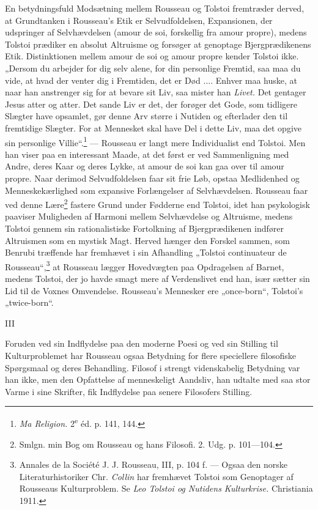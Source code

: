 \documentclass[12pt,a4paper,openany]{book}
\newcommand{\opage}[1]{\marginnote{\footnotesize\textit{[#1]}}}
\begin{document}
En betydningsfuld Modsætning mellem Rousseau og Tolstoi
fremtræder derved, at Grundtanken i Rousseau’s Etik er Selvudfoldelsen,
Expansionen, der udspringer af Selvhævdelsen (amour
de soi, forskellig fra amour propre), medens Tolstoi prædiker en
absolut Altruisme og forsøger at genoptage Bjergprædikenens
Etik. Distinktionen mellem amour de soi og amour propre kender
Tolstoi ikke. „Dersom du arbejder for dig selv alene, for
din personlige Fremtid, saa maa du vide, at hvad der venter
dig i Fremtiden, det er Død .... Enhver maa huske, at naar
han anstrenger sig for at bevare sit Liv, saa mister han \textit{Livet.}
Det gentager Jesus atter og atter. Det sande Liv er det, der
forøger det Gode, som tidligere Slægter have opsamlet, gør denne
Arv større i Nutiden og efterlader den til fremtidige Slægter.
For at Mennesket skal have Del i dette Liv, maa det opgive
\setcounter{footnote}{0}%
\opage{130}sin personlige Villie“.\footnote[1]{\textit{Ma Religion.} 2\textsuperscript{e} éd. p. 141, 144.} --- Rousseau er langt mere Individualist
end Tolstoi. Men han viser paa en interessant Maade, at det
først er ved Sammenligning med Andre, deres Kaar og deres
Lykke, at amour de soi kan gaa over til amour propre. Naar
derimod Selvudfoldelsen faar sit frie Løb, opstaa Medlidenhed
og Menneskekærlighed som expansive Forlængelser af Selvhævdelsen.
Rousseau faar ved denne Lære\footnote[2]{Smlgn. min Bog om Rousseau og hans Filosofi. 2. Udg. p. 101---104.} fastere Grund under
Fødderne end Tolstoi, idet han psykologisk paaviser Muligheden
af Harmoni mellem Selvhævdelse og Altruisme, medens Tolstoi
gennem sin rationalistiske Fortolkning af Bjergprædikenen indfører
Altruismen som en mystisk Magt. Herved hænger den Forskel
sammen, som Benrubi træffende har fremhævet i sin Afhandling
„Tolstoi continuateur de Rousseau“,\footnote[3]{Annales de la Société J. J. Rousseau, III, p. 104 f. --- Ogsaa den norske Literaturhistoriker Chr. \emph{Collin} har fremhævet Tolstoi som Genoptager af Rousseaus Kulturproblem. Se \textit{Leo Tolstoi og Nutidens Kulturkrise.} Christiania 1911.} at Rousseau lægger Hovedvægten
paa Opdragelsen af Barnet, medens Tolstoi, der jo havde
smagt mere af Verdenslivet end han, især sætter sin Lid til de
Voxnes Omvendelse. Rousseau’s Mennesker ere „once-born“,
Tolstoi’s „twice-born“.

\begin{center}III\end{center}


Foruden ved sin Indflydelse paa den moderne Poesi og ved
sin Stilling til Kulturproblemet har Rousseau ogsaa Betydning
for flere speciellere filosofiske Spørgsmaal og deres Behandling.
Filosof i strengt videnskabelig Betydning var han ikke, men
den Opfattelse af menneskeligt Aandsliv, han udtalte med saa
stor Varme i sine Skrifter, fik Indflydelse paa senere Filosofers
Stilling.
\end{document}
